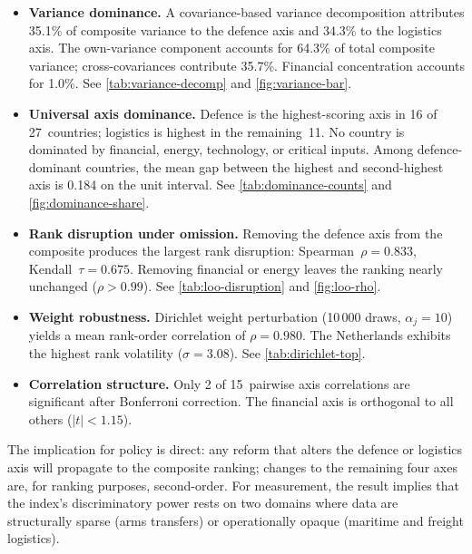 \begin{itemize}[leftmargin=2em]

\item \textbf{Variance dominance.}
  A covariance-based variance decomposition attributes 35.1\% of
  composite variance to the defence axis and 34.3\% to the logistics
  axis.  The own-variance component accounts for 64.3\% of total
  composite variance; cross-covariances contribute 35.7\%.
  Financial concentration accounts for 1.0\%.
  See \cref{tab:variance-decomp} and \cref{fig:variance-bar}.

\item \textbf{Universal axis dominance.}
  Defence is the highest-scoring axis in 16 of 27~countries;
  logistics is highest in the remaining~11.  No country is dominated
  by financial, energy, technology, or critical inputs.  Among
  defence-dominant countries, the mean gap between the highest and
  second-highest axis is 0.184 on the unit interval.
  See \cref{tab:dominance-counts} and \cref{fig:dominance-share}.

\item \textbf{Rank disruption under omission.}
  Removing the defence axis from the composite produces the largest
  rank disruption: Spearman~$\rho = 0.833$, Kendall~$\tau = 0.675$.
  Removing financial or energy leaves the ranking nearly unchanged
  ($\rho > 0.99$).
  See \cref{tab:loo-disruption} and \cref{fig:loo-rho}.

\item \textbf{Weight robustness.}
  Dirichlet weight perturbation (10\,000 draws, $\alpha_j = 10$)
  yields a mean rank-order correlation of $\rho = 0.980$.  The
  Netherlands exhibits the highest rank volatility ($\sigma = 3.08$).
  See \cref{tab:dirichlet-top}.

\item \textbf{Correlation structure.}
  Only 2 of 15~pairwise axis correlations are significant after
  Bonferroni correction.  The financial axis is orthogonal to all
  others ($|t| < 1.15$).

\end{itemize}

\medskip
\noindent
The implication for policy is direct: any reform that alters the
defence or logistics axis will propagate to the composite ranking;
changes to the remaining four axes are, for ranking purposes,
second-order.  For measurement, the result implies that the index's
discriminatory power rests on two domains where data are structurally
sparse (arms transfers) or operationally opaque (maritime and freight
logistics).
